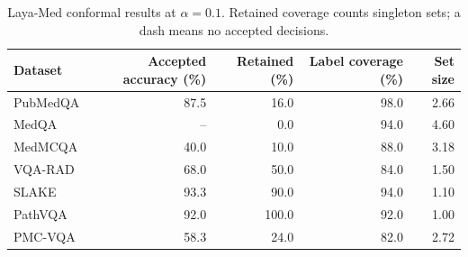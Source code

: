 \begin{table}[t]
\centering\small
\setlength{\tabcolsep}{5pt}
\begin{tabular}{lrrrr}
\toprule
Dataset & Accepted accuracy (\%) & Retained (\%) & Label coverage (\%) & Set size \\
\midrule
PubMedQA & 87.5 & 16.0 & 98.0 & 2.66 \\
MedQA & -- & 0.0 & 94.0 & 4.60 \\
MedMCQA & 40.0 & 10.0 & 88.0 & 3.18 \\
VQA-RAD & 68.0 & 50.0 & 84.0 & 1.50 \\
SLAKE & 93.3 & 90.0 & 94.0 & 1.10 \\
PathVQA & 92.0 & 100.0 & 92.0 & 1.00 \\
PMC-VQA & 58.3 & 24.0 & 82.0 & 2.72 \\

\bottomrule
\end{tabular}
\caption{Laya-Med conformal results at $\alpha=0.1$. Retained coverage counts singleton sets; a dash means no accepted decisions.}
\label{tab:updated_posthoc}
\end{table}

